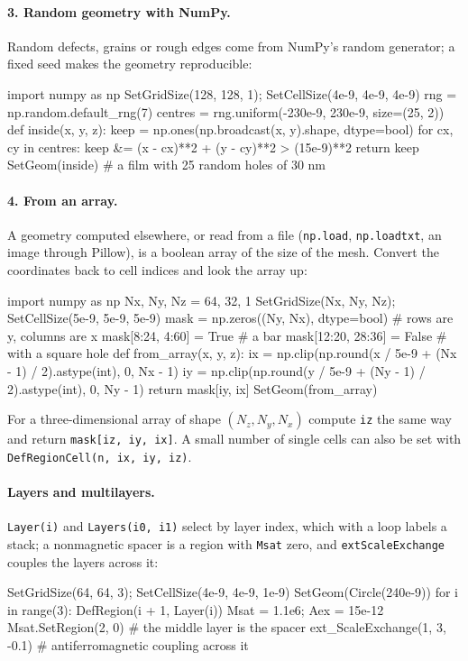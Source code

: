 \documentclass[11pt,a4paper,oneside]{book}
\newcommand{\code}[1]{\texttt{#1}}
\renewcommand{\_}{\textunderscore\allowbreak}
\begin{document}
\paragraph{3. Random geometry with NumPy.} Random defects, grains or rough edges come from NumPy's random
generator; a fixed seed makes the geometry reproducible:
\begin{pycode}
import numpy as np
SetGridSize(128, 128, 1); SetCellSize(4e-9, 4e-9, 4e-9)
rng = np.random.default_rng(7)
centres = rng.uniform(-230e-9, 230e-9, size=(25, 2))
def inside(x, y, z):
    keep = np.ones(np.broadcast(x, y).shape, dtype=bool)
    for cx, cy in centres:
        keep &= (x - cx)**2 + (y - cy)**2 > (15e-9)**2
    return keep
SetGeom(inside)               # a film with 25 random holes of 30 nm
\end{pycode}

\paragraph{4. From an array.} A geometry computed elsewhere, or read from a file (\code{np.load},
\code{np.loadtxt}, an image through Pillow), is a boolean array of the size of the mesh. Convert the
coordinates back to cell indices and look the array up:
\begin{pycode}
import numpy as np
Nx, Ny, Nz = 64, 32, 1
SetGridSize(Nx, Ny, Nz); SetCellSize(5e-9, 5e-9, 5e-9)
mask = np.zeros((Ny, Nx), dtype=bool)          # rows are y, columns are x
mask[8:24, 4:60] = True                        # a bar
mask[12:20, 28:36] = False                     # with a square hole
def from_array(x, y, z):
    ix = np.clip(np.round(x / 5e-9 + (Nx - 1) / 2).astype(int), 0, Nx - 1)
    iy = np.clip(np.round(y / 5e-9 + (Ny - 1) / 2).astype(int), 0, Ny - 1)
    return mask[iy, ix]
SetGeom(from_array)
\end{pycode}
For a three-dimensional array of shape $(N_z, N_y, N_x)$ compute \code{iz} the same way and return
\code{mask[iz, iy, ix]}. A small number of single cells can also be set with \code{DefRegionCell(n, ix, iy, iz)}.

\paragraph{Layers and multilayers.} \code{Layer(i)} and \code{Layers(i0, i1)} select by layer index, which with a
loop labels a stack; a nonmagnetic spacer is a region with \code{Msat} zero, and \code{ext\_ScaleExchange} couples
the layers across it:
\begin{pycode}
SetGridSize(64, 64, 3); SetCellSize(4e-9, 4e-9, 1e-9)
SetGeom(Circle(240e-9))
for i in range(3):
    DefRegion(i + 1, Layer(i))
Msat = 1.1e6; Aex = 15e-12
Msat.SetRegion(2, 0)                 # the middle layer is the spacer
ext_ScaleExchange(1, 3, -0.1)        # antiferromagnetic coupling across it
\end{pycode}
\end{document}
